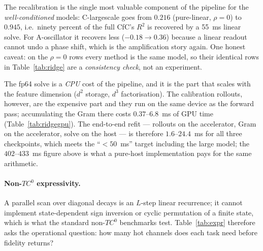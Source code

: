 \documentclass[11pt]{article}
\theoremstyle{definition}
\begin{document}
The recalibration is the single most valuable component of the pipeline for the \emph{well-conditioned} models:
C-largescale goes from $0.216$ (pure-linear, $\rho=0$) to $0.945$, i.e.\ ninety percent of the full CfC's
$R^2$ is recovered by a 55~ms linear solve. For A-oscillator it recovers less ($-0.18\to0.36$) because a
linear readout cannot undo a phase shift, which is the amplification story again. One honest caveat: on the
$\rho=0$ rows every method is the same model, so their identical rows in Table~\ref{tab:ridge} are a
\emph{consistency check}, not an experiment.

The fp64 solve is a \emph{CPU} cost of the pipeline, and it is the part that scales with the feature dimension
($d^2$ storage, $d^3$ factorisation). The calibration rollouts, however, are the expensive part and they run on
the same device as the forward pass; accumulating the Gram there costs $0.37$--$6.8$~ms of GPU time
(Table~\ref{tab:ridgegpu}). The end-to-end refit --- rollouts on the accelerator, Gram on the accelerator,
solve on the host --- is therefore $1.6$--$24.4$~ms for all three checkpoints, which meets the ``$<50$~ms''
target including the large model; the $402$--$433$~ms figure above is what a pure-host implementation pays for
the same arithmetic.

\begin{table}[tbp]
\centering
\caption{Where the recalibration time actually goes, per method and checkpoint. ``Rollouts'' is the
$128\times256$ calibration forward pass on the RTX~5070 (batches of 16, fp32), ``Gram'' the FP32 accumulation
of $A$ and $r$ on the same device (median of 20 timed repetitions), ``fp64 solve'' the host-side Cholesky
solve, and ``refit'' their sum.}
\label{tab:ridgegpu}


\end{table}

\paragraph{Non-$TC^0$ expressivity.} A parallel scan over diagonal decays is an $L$-step linear recurrence; it
cannot implement state-dependent sign inversion or cyclic permutation of a finite state, which is what the
standard non-$TC^0$ benchmarks test. Table~\ref{tab:expr} therefore asks the operational question: how many
hot channels does each task need before fidelity returns?

\begin{table}[tbp]
\centering
\caption{Non-$TC^0$ suite, $D=256$, $L=256$ evaluated on unseen sequences. ``Zero-shot'' applies the
jacobian/variance/random ordering to the trained full-CfC weights without any gradient step; ``DAFT'' is five
epochs of decoupling-aware fine-tuning (gradients masked to the hot block, lr $10^{-3}$).}
\label{tab:expr}


\end{table}
\end{document}
